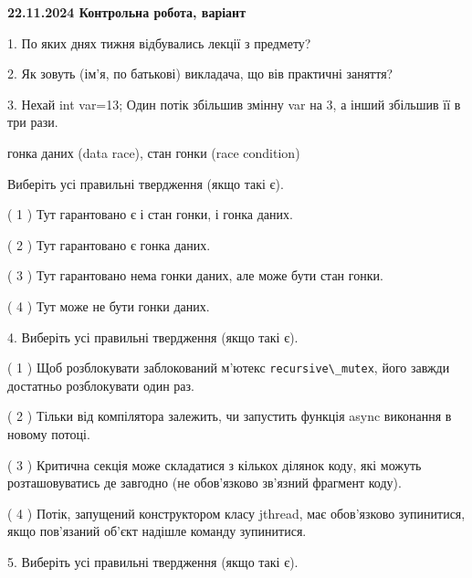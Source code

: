 \documentclass[12pt, ukrainian]{article}
\def\code#1{\Verb!#1!}
\begin{document}
\vspace{4mm}
\newpage
\begin {large}

\textbf{22.11.2024 Контрольна робота, варіант  }\par


{
1. По яких днях тижня відбувались лекції з предмету?



\vspace{5mm}
2. Як зовуть (ім'я, по батькові) викладача, що вів практичні заняття?



\vspace{5mm}
3. Нехай int var=13; Один потік збільшив змінну var на 3, а інший збільшив її в три рази.

гонка даних (data race), стан гонки (race condition)

Виберіть усі правильні твердження (якщо такі є).\par
\vspace{2mm}
( 1 ) Тут гарантовано є і стан гонки, і гонка даних.%

( 2 ) Тут гарантовано є гонка даних.%

( 3 ) Тут гарантовано нема гонки даних, але може бути стан гонки.%

( 4 ) Тут може не бути гонки даних.%


\vspace{5mm}
4. Виберіть усі правильні твердження (якщо такі є).\par
\vspace{2mm}

( 1 ) Щоб розблокувати заблокований м’ютекс \code{recursive\_mutex}, його завжди достатньо розблокувати один раз.%

( 2 ) Тільки від компілятора залежить, чи запустить функція async виконання в новому потоці.%

( 3 ) Критична секція може складатися з кількох ділянок коду, які можуть розташовуватись де завгодно (не обов’язково зв’язний фрагмент коду).%

( 4 ) Потік, запущений конструктором класу jthread, має обов’язково зупинитися, якщо пов’язаний об’єкт надішле команду зупинитися.%


\vspace{5mm}
5. Виберіть усі правильні твердження (якщо такі є).\par
\vspace{2mm}

}
\end{large}
\end{document}
